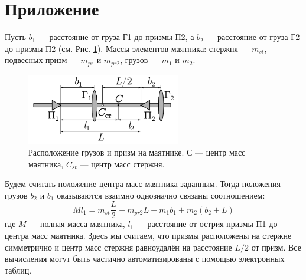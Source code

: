 \documentclass[a4paper, 12pt]{article}
\begin{document}
\section{Приложение}\label{Приложение}
Пусть $b_1$ — расстояние от груза Г1 до призмы П2, а $b_2$ — расстояние от груза Г2 до призмы П2 (см. Рис. \ref{ustan2}). Массы элементов маятника: стержня — $m_{st}$, подвесных призм — $m_{pr}$ и $m_{pr2}$, грузов — $m_1$ и $m_2$. \newline
\begin{figure}[h!]
		\begin{center}
			\includegraphics[width = 0.6\textwidth]{5.png}
			\caption{Расположение грузов и призм на маятнике. С — центр масс маятника, $C_{st}$ — центр масс стержня.}
			\label{ustan2}
		\end{center}
	\end{figure}
Будем считать положение центра масс маятника заданным. Тогда положения грузов $b_2$ и $b_1$ оказываются взаимно однозначно связаны соотношением: \newline
\begin{equation}
    \label{16}
    Ml_1 = m_{st}\frac{L}{2}+m_{pr2}L+m_1b_1+m_2(b_2+L) 
\end{equation}
где $M$ — полная масса маятника, $l_1$ —
расстояние от острия призмы П1 до центра масс маятника. Здесь мы считаем, что призмы расположены на стержне симметрично и центр масс стержня равноудалён на расстояние $L/2$ от призм. Все вычисления могут быть частично автоматизированы с помощью электронных таблиц.

    
\end{document}
